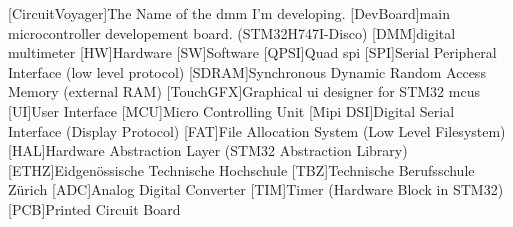 \begin{acronym}
        [CircuitVoyager]{The Name of the \acs{dmm} I'm developing.}
        [DevBoard]{main microcontroller developement board. (STM32H747I-Disco)}
        [DMM]{digital multimeter}
        [HW]{Hardware}
        [SW]{Software}
        [QPSI]{Quad \acs{spi}}
        [SPI]{Serial Peripheral Interface (low level protocol)}
        [SDRAM]{Synchronous Dynamic Random Access Memory (external RAM)}
        [TouchGFX]{Graphical \acs{ui} designer for STM32 \acs{mcu}s}
        [UI]{User Interface}
        [MCU]{Micro Controlling Unit}
        [Mipi DSI]{Digital Serial Interface (Display Protocol)}
        [FAT]{File Allocation System (Low Level Filesystem)}
        [HAL]{Hardware Abstraction Layer (STM32 Abstraction Library)}
        [ETHZ]{Eidgenössische Technische Hochschule}
        [TBZ]{Technische Berufsschule Zürich}
        [ADC]{Analog Digital Converter}
        [TIM]{Timer (Hardware Block in STM32)}
        [PCB]{Printed Circuit Board}
\end{acronym}